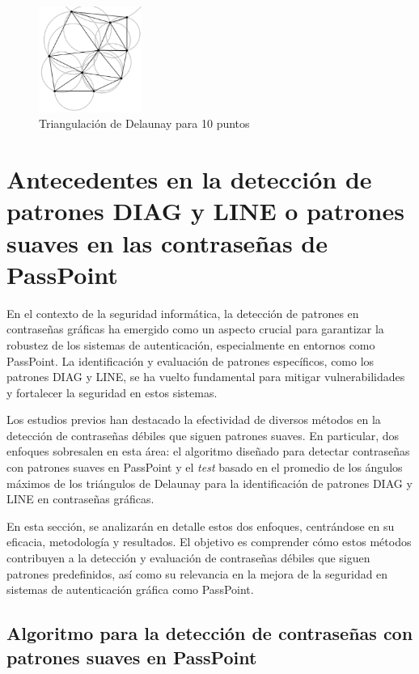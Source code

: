 \documentclass[12pt]{report}
\begin{document}
	\begin{figure}[ht]
		\centering
		\includegraphics[width=0.3\textwidth]{td_10pts.png}
		\caption{Triangulación de Delaunay para 10 puntos}
		\label{Triangulación}
	\end{figure}

\section{Antecedentes en la detección de patrones DIAG y LINE o patrones suaves en las contraseñas de PassPoint}	
	En el contexto de la seguridad informática, la detección de patrones en contraseñas gráficas ha emergido como un aspecto crucial para garantizar la robustez de los sistemas de autenticación, especialmente en entornos como PassPoint. La identificación y evaluación de patrones específicos, como los patrones DIAG y LINE, se ha vuelto fundamental para mitigar vulnerabilidades y fortalecer la seguridad en estos sistemas.
	
	Los estudios previos han destacado la efectividad de diversos métodos en la detección de contraseñas débiles que siguen patrones suaves. En particular, dos enfoques sobresalen en esta área: el algoritmo diseñado para detectar contraseñas con patrones suaves en PassPoint \cite{3} y el \textit{test} basado en el promedio de los ángulos máximos de los triángulos de Delaunay \cite{13} para la identificación de patrones DIAG y LINE en contraseñas gráficas.
	
	En esta sección, se analizarán en detalle estos dos enfoques, centrándose en su eficacia, metodología y resultados. El objetivo es comprender cómo estos métodos contribuyen a la detección y evaluación de contraseñas débiles que siguen patrones predefinidos, así como su relevancia en la mejora de la seguridad en sistemas de autenticación gráfica como PassPoint.

\subsection{Algoritmo para la detección de contraseñas con patrones suaves en PassPoint}
\end{document}
